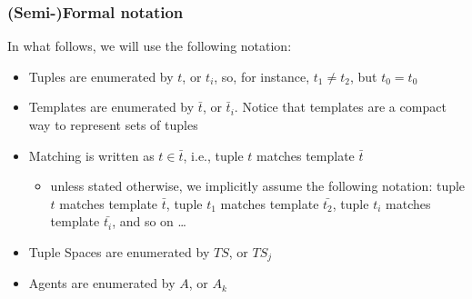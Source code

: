 \documentclass[presentation]{beamer}\mode<presentation>{\usetheme{AMSCesenaPurpleAndGold}}
\begin{document}
\begin{frame}%
\frametitle{(Semi-)Formal notation}

In what follows, we will use the following notation:
%
\vfill
%
\begin{itemize}
\item Tuples are enumerated by \alert{$t$}, or $t_i$, so, for instance, $t_1 \neq t_2$, but $t_0 = t_0$

\item Templates are enumerated by \alert{$\bar{t}$}, or $\bar{t}_i$. Notice that templates are a compact way to represent \alert{sets} of tuples

\item Matching is written as \alert{$t \in \bar{t}$}, i.e., tuple $t$ matches template $\bar{t}$
%
\begin{itemize}
\item unless stated otherwise, we implicitly assume the following notation: tuple $t$ matches template $\bar{t}$, tuple $t_1$ matches template $\bar{t_2}$, tuple $t_i$ matches template $\bar{t_i}$, and so on \ldots
\end{itemize}

\item Tuple Spaces are enumerated by \alert{$TS$}, or $TS_j$

\item Agents are enumerated by \alert{$A$}, or $A_k$
\end{itemize}

\end{frame}
\end{document}
